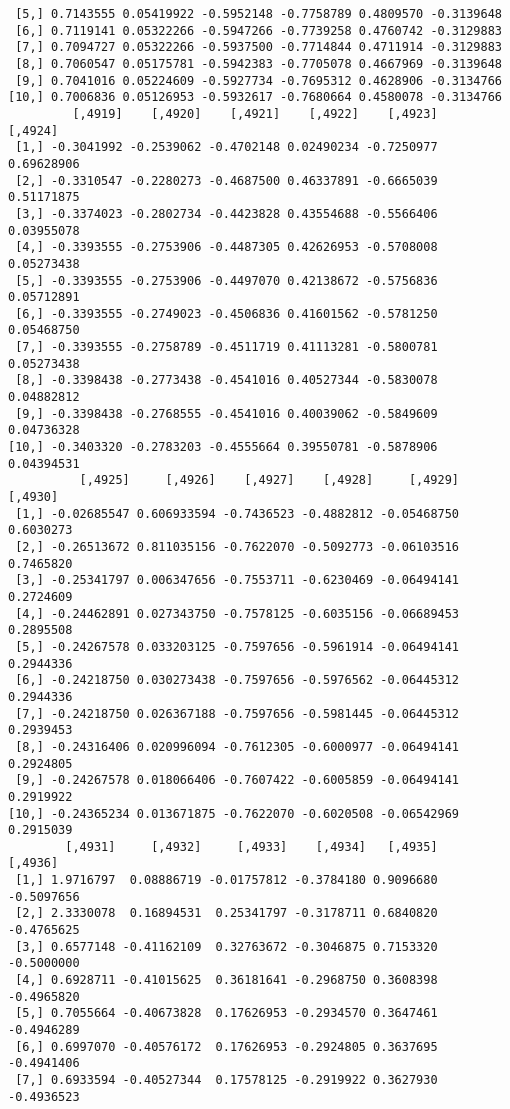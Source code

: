 \documentclass[
  letterpaper,
  DIV=11,
  numbers=noendperiod]{scrreprt}
\begin{document}
\begin{verbatim}
 [5,] 0.7143555 0.05419922 -0.5952148 -0.7758789 0.4809570 -0.3139648
 [6,] 0.7119141 0.05322266 -0.5947266 -0.7739258 0.4760742 -0.3129883
 [7,] 0.7094727 0.05322266 -0.5937500 -0.7714844 0.4711914 -0.3129883
 [8,] 0.7060547 0.05175781 -0.5942383 -0.7705078 0.4667969 -0.3139648
 [9,] 0.7041016 0.05224609 -0.5927734 -0.7695312 0.4628906 -0.3134766
[10,] 0.7006836 0.05126953 -0.5932617 -0.7680664 0.4580078 -0.3134766
         [,4919]    [,4920]    [,4921]    [,4922]    [,4923]    [,4924]
 [1,] -0.3041992 -0.2539062 -0.4702148 0.02490234 -0.7250977 0.69628906
 [2,] -0.3310547 -0.2280273 -0.4687500 0.46337891 -0.6665039 0.51171875
 [3,] -0.3374023 -0.2802734 -0.4423828 0.43554688 -0.5566406 0.03955078
 [4,] -0.3393555 -0.2753906 -0.4487305 0.42626953 -0.5708008 0.05273438
 [5,] -0.3393555 -0.2753906 -0.4497070 0.42138672 -0.5756836 0.05712891
 [6,] -0.3393555 -0.2749023 -0.4506836 0.41601562 -0.5781250 0.05468750
 [7,] -0.3393555 -0.2758789 -0.4511719 0.41113281 -0.5800781 0.05273438
 [8,] -0.3398438 -0.2773438 -0.4541016 0.40527344 -0.5830078 0.04882812
 [9,] -0.3398438 -0.2768555 -0.4541016 0.40039062 -0.5849609 0.04736328
[10,] -0.3403320 -0.2783203 -0.4555664 0.39550781 -0.5878906 0.04394531
          [,4925]     [,4926]    [,4927]    [,4928]     [,4929]   [,4930]
 [1,] -0.02685547 0.606933594 -0.7436523 -0.4882812 -0.05468750 0.6030273
 [2,] -0.26513672 0.811035156 -0.7622070 -0.5092773 -0.06103516 0.7465820
 [3,] -0.25341797 0.006347656 -0.7553711 -0.6230469 -0.06494141 0.2724609
 [4,] -0.24462891 0.027343750 -0.7578125 -0.6035156 -0.06689453 0.2895508
 [5,] -0.24267578 0.033203125 -0.7597656 -0.5961914 -0.06494141 0.2944336
 [6,] -0.24218750 0.030273438 -0.7597656 -0.5976562 -0.06445312 0.2944336
 [7,] -0.24218750 0.026367188 -0.7597656 -0.5981445 -0.06445312 0.2939453
 [8,] -0.24316406 0.020996094 -0.7612305 -0.6000977 -0.06494141 0.2924805
 [9,] -0.24267578 0.018066406 -0.7607422 -0.6005859 -0.06494141 0.2919922
[10,] -0.24365234 0.013671875 -0.7622070 -0.6020508 -0.06542969 0.2915039
        [,4931]     [,4932]     [,4933]    [,4934]   [,4935]    [,4936]
 [1,] 1.9716797  0.08886719 -0.01757812 -0.3784180 0.9096680 -0.5097656
 [2,] 2.3330078  0.16894531  0.25341797 -0.3178711 0.6840820 -0.4765625
 [3,] 0.6577148 -0.41162109  0.32763672 -0.3046875 0.7153320 -0.5000000
 [4,] 0.6928711 -0.41015625  0.36181641 -0.2968750 0.3608398 -0.4965820
 [5,] 0.7055664 -0.40673828  0.17626953 -0.2934570 0.3647461 -0.4946289
 [6,] 0.6997070 -0.40576172  0.17626953 -0.2924805 0.3637695 -0.4941406
 [7,] 0.6933594 -0.40527344  0.17578125 -0.2919922 0.3627930 -0.4936523

\end{verbatim}
\end{document}
